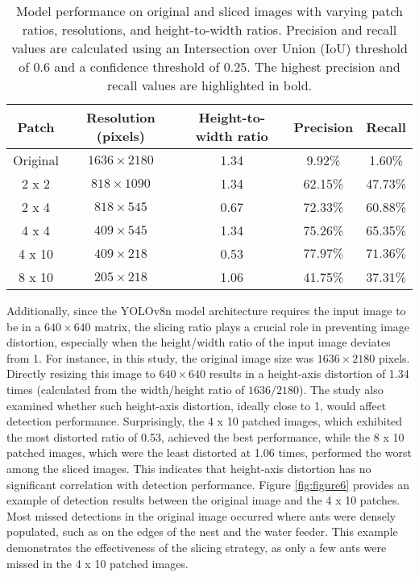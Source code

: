 \begin{table}[H]
    \centering
    \caption{Model performance on original and sliced images with varying patch ratios, resolutions, and height-to-width ratios. Precision and recall values are calculated using an Intersection over Union (IoU) threshold of 0.6 and a confidence threshold of 0.25. The highest precision and recall values are highlighted in bold.}
    \label{table3}
    \begin{tabular}{ccccc}
        \toprule
        \textbf{Patch} & \textbf{Resolution (pixels)} & \textbf{Height-to-width ratio} & \textbf{Precision} & \textbf{Recall} \\
        \midrule
        Original & $1636 \times 2180$ & 1.34 & 9.92\% & 1.60\% \\
        2 x 2 & $818 \times 1090$ & 1.34 & 62.15\% & 47.73\% \\
        2 x 4 & $818 \times 545$ & 0.67 & 72.33\% & 60.88\% \\
        4 x 4 & $409 \times 545$ & 1.34 & 75.26\% & 65.35\% \\
        4 x 10 & $409 \times 218$ & 0.53 & $\mathbf{77.97\%}$ & $\mathbf{71.36\%}$ \\
        8 x 10 & $205 \times 218$ & 1.06 & 41.75\% & 37.31\% \\
        \bottomrule
    \end{tabular}
\end{table}

Additionally, since the YOLOv8n model architecture requires the input image to be in a $640 \times 640$ matrix, the slicing ratio plays a crucial role in preventing image distortion, especially when the height/width ratio of the input image deviates from 1. For instance, in this study, the original image size was $1636 \times 2180$ pixels. Directly resizing this image to $640 \times 640$ results in a height-axis distortion of 1.34 times (calculated from the width/height ratio of $1636/2180$). The study also examined whether such height-axis distortion, ideally close to 1, would affect detection performance. Surprisingly, the 4 x 10 patched images, which exhibited the most distorted ratio of 0.53, achieved the best performance, while the 8 x 10 patched images, which were the least distorted at 1.06 times, performed the worst among the sliced images. This indicates that height-axis distortion has no significant correlation with detection performance. Figure \ref{fig:figure6} provides an example of detection results between the original image and the 4 x 10 patches. Most missed detections in the original image occurred where ants were densely populated, such as on the edges of the nest and the water feeder. This example demonstrates the effectiveness of the slicing strategy, as only a few ants were missed in the 4 x 10 patched images.

